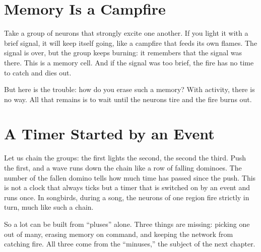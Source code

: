 
\section*{Memory Is a Campfire}

Take a group of neurons that strongly excite one another. If you light it with a brief signal, it will keep itself going, like a campfire that feeds its own flames. The signal is over, but the group keeps burning: it remembers that the signal was there. This is a memory cell. And if the signal was too brief, the fire has no time to catch and dies out.

But here is the trouble: how do you erase such a memory? With activity, there is no way. All that remains is to wait until the neurons tire and the fire burns out.

\section*{A Timer Started by an Event}

Let us chain the groups: the first lights the second, the second the third. Push the first, and a wave runs down the chain like a row of falling dominoes. The number of the fallen domino tells how much time has passed since the push. This is not a clock that always ticks but a timer that is switched on by an event and runs once. In songbirds, during a song, the neurons of one region fire strictly in turn, much like such a chain.

So a lot can be built from ``pluses'' alone. Three things are missing: picking one out of many, erasing memory on command, and keeping the network from catching fire. All three come from the ``minuses,'' the subject of the next chapter.

